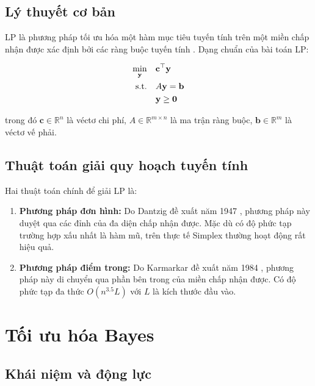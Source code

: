 \subsection{Lý thuyết cơ bản}

LP là phương pháp tối ưu hóa một hàm mục tiêu tuyến tính trên một miền chấp nhận được xác định bởi các ràng buộc tuyến tính \cite{bertsimas1997lp}. Dạng chuẩn của bài toán LP:

\begin{align}
    \min_{\mathbf{y}} \quad & \mathbf{c}^\top \mathbf{y} \label{eq:lp_obj}\\
    \text{s.t.} \quad & A\mathbf{y} = \mathbf{b} \notag\\
    & \mathbf{y} \geq \mathbf{0} \notag
\end{align}

\noindent trong đó $\mathbf{c} \in \mathbb{R}^n$ là véctơ chi phí, $A \in \mathbb{R}^{m \times n}$ là ma trận ràng buộc, $\mathbf{b} \in \mathbb{R}^m$ là véctơ vế phải.

\subsection{Thuật toán giải quy hoạch tuyến tính}

Hai thuật toán chính để giải LP là:

\begin{enumerate}
    \item \textbf{Phương pháp đơn hình:} Do Dantzig đề xuất năm 1947 \cite{dantzig1951simplex}, phương pháp này duyệt qua các đỉnh của đa diện chấp nhận được. Mặc dù có độ phức tạp trường hợp xấu nhất là hàm mũ, trên thực tế Simplex thường hoạt động rất hiệu quả.
    
    \item \textbf{Phương pháp điểm trong:} Do Karmarkar đề xuất năm 1984 \cite{karmarkar1984interior}, phương pháp này di chuyển qua phần bên trong của miền chấp nhận được. Có độ phức tạp đa thức $O(n^{3.5}L)$ với $L$ là kích thước đầu vào.
\end{enumerate}


\section{Tối ưu hóa Bayes}

\subsection{Khái niệm và động lực}

